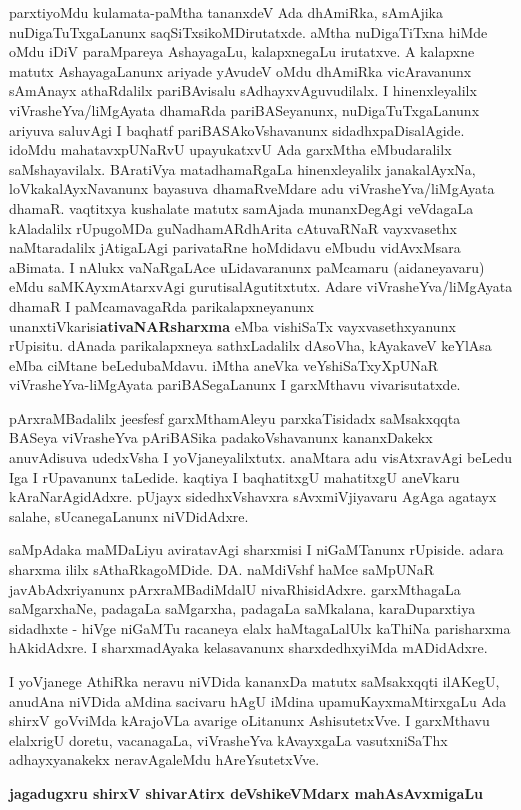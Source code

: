parxtiyoMdu kulamata-paMtha tananxdeV Ada dhAmiRka, sAmAjika nuDigaTuTxgaLanunx saqSiTxsikoMDirutatxde. aMtha nuDigaTiTxna hiMde oMdu iDiV paraMpareya AshayagaLu, kalapxnegaLu irutatxve. A kalapxne matutx AshayagaLanunx ariyade yAvudeV oMdu dhAmiRka vicAravanunx sAmAnayx athaRdalilx pariBAvisalu sAdhayxvAguvudilalx. I hinenxleyalilx viVrasheYva/liMgAyata dhamaRda pariBASe\-yanunx, nuDigaTuTxgaLanunx ariyuva saluvAgi I baqhatf pariBASAkoVshavanunx sidadhxpaDisalAgide. idoMdu mahatavx\-pUNaRvU upayukatxvU Ada garxMtha eMbudaralilx saMshayavilalx. BAratiVya matadhamaRgaLa hinenxleyalilx janakalAyxNa, loVkakalAyxNa\-vanunx bayasuva dhamaRveMdare adu viVrasheYva/liMgAyata dhamaR. vaqtitxya kushalate matutx samAjada munanxDegAgi veVdagaLa kAladalilx rUpugoMDa guNadhamARdhArita cAtuvaRNaR vayxvasethx naMtaradalilx jAtigaLAgi parivataRne hoMdi\-davu eMbudu \hbox{vidAvxMsara} aBimata. I nAlukx vaNaRgaLAce uLidavaranunx paMcamaru (aidaneyavaru) eMdu saMKAyxmAtarxvAgi gurutisalAgutitxtutx. Adare viVrasheYva/liMgAyata dhamaR I paMcamavagaRda parikalapxneyanunx unanxtiVkarisi\break \textbf{ativaNARsharxma} eMba vishiSaTx vayxvasethxyanunx rUpisitu. dAnada parikalapxneya sathxLadalilx dAsoVha, kAyakaveV keYlAsa eMba ciMtane beLedubaMdavu. iMtha aneVka veYshiSaTxyXpUNaR viVrasheYva-liMgAyata pariBASegaLanunx I garxMthavu vivarisutatxde.

\medskip

pArxraMBadalilx jeesfesf garxMthamAleyu parxkaTisidadx saMsakxqqta BASeya viVrasheYva pAriBASika padakoVshavanunx kananxDakekx anuvAdisuva udedxVsha I yoVjaneyalilxtutx. anaMtara adu visAtxravAgi beLedu Iga I rUpavanunx taLedide. kaqtiya I baqhatitxgU mahatitxgU aneVkaru kAraNarAgidAdxre. pUjayx sidedhxVshavxra sAvxmiVjiyavaru AgAga agatayx salahe, sUcanegaLanunx niVDidAdxre.

\medskip

saMpAdaka maMDaLiyu aviratavAgi sharxmisi I niGaMTanunx rUpiside. adara sharxma ililx sAthaRkagoMDide. DA. naMdiVshf haMce saMpUNaR javAbAdxriyanunx pArxraMBadiMdalU nivaRhisidAdxre. garxMthagaLa saMgarxhaNe, padagaLa saMgarxha, padagaLa saMkalana, karaDuparxtiya sidadhxte - hiVge niGaMTu racaneya elalx haMtagaLalUlx kaThiNa parisharxma hAkidAdxre. I sharxmadAyaka kelasavanunx sharxdedhxyiMda mADidAdxre. 
\medskip

I yoVjanege AthiRka neravu niVDida kananxDa matutx saMsakxqqti ilAKegU, anudAna niVDida aMdina sacivaru hAgU iMdina upamuKayxmaMtirxgaLu Ada shirxV goVviMda kArajoVLa avarige oLitanunx AshisutetxVve. I garxMthavu elalxrigU doretu, vacanagaLa, viVrasheYva kAvayxgaLa vasutxniSaThx adhayxyanakekx neravAgaleMdu hAreYsutetxVve.

\vskip 1cm

\hfill {\large\bf jagadugxru shirxV shivarAtirx deVshikeVMdarx mahAsAvxmigaLu}

